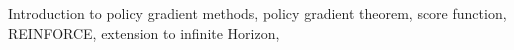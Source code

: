Introduction to policy gradient methods, policy gradient theorem, score function, REINFORCE, extension to infinite Horizon,